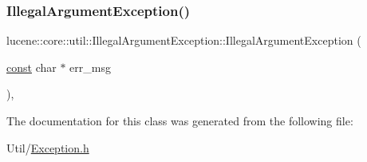 \subsubsection{\texorpdfstring{Illegal\+Argument\+Exception()}{IllegalArgumentException()}\hspace{0.1cm}{\footnotesize\ttfamily [3/3]}}
{\footnotesize\ttfamily lucene\+::core\+::util\+::\+Illegal\+Argument\+Exception\+::\+Illegal\+Argument\+Exception (\begin{DoxyParamCaption}\item[{\mbox{\hyperlink{ZlibCrc32_8h_a2c212835823e3c54a8ab6d95c652660e}{const}} char $\ast$}]{err\+\_\+msg }\end{DoxyParamCaption})\hspace{0.3cm}{\ttfamily [inline]}, {\ttfamily [explicit]}}



The documentation for this class was generated from the following file\+:\begin{DoxyCompactItemize}
\item 
Util/\mbox{\hyperlink{Util_2Exception_8h}{Exception.\+h}}\end{DoxyCompactItemize}
